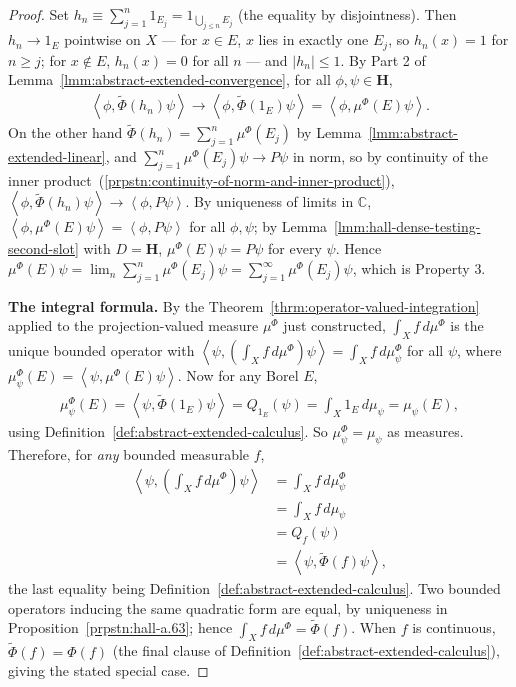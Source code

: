 \begin{proof}
Set $h_n \equiv \sum_{j=1}^n 1_{E_j} = 1_{\bigcup_{j\le n}E_j}$ (the equality by disjointness). Then $h_n \to 1_E$ pointwise on $X$ — for $x \in E$, $x$ lies in exactly one $E_j$, so $h_n(x) = 1$ for $n \ge j$; for $x \notin E$, $h_n(x)=0$ for all $n$ — and $\lvert h_n \rvert \le 1$. By Part 2 of Lemma~\ref{lmm:abstract-extended-convergence}, for all $\phi,\psi \in \mathbf{H}$,
\begin{align}
    \left< \phi, \widetilde\Phi(h_n)\psi \right> \longrightarrow \left< \phi, \widetilde\Phi(1_E)\psi \right> = \left< \phi, \mu^\Phi(E)\psi \right>.
\end{align}
On the other hand $\widetilde\Phi(h_n) = \sum_{j=1}^n \mu^\Phi(E_j)$ by Lemma~\ref{lmm:abstract-extended-linear}, and $\sum_{j=1}^n\mu^\Phi(E_j)\psi \to P\psi$ in norm, so by continuity of the inner product~(\ref{prpstn:continuity-of-norm-and-inner-product}), $\left< \phi, \widetilde\Phi(h_n)\psi \right> \to \left< \phi, P\psi \right>$. By uniqueness of limits in $\mathbb{C}$, $\left< \phi, \mu^\Phi(E)\psi \right> = \left< \phi, P\psi \right>$ for all $\phi,\psi$; by Lemma~\ref{lmm:hall-dense-testing-second-slot} with $D=\mathbf{H}$, $\mu^\Phi(E)\psi = P\psi$ for every $\psi$. Hence $\mu^\Phi(E)\psi = \lim_n \sum_{j=1}^n \mu^\Phi(E_j)\psi = \sum_{j=1}^\infty \mu^\Phi(E_j)\psi$, which is Property 3.

\textbf{The integral formula.} By the Theorem~\ref{thrm:operator-valued-integration} applied to the projection-valued measure $\mu^\Phi$ just constructed, $\int_X f\,d\mu^\Phi$ is the unique bounded operator with $\left< \psi, \left( \int_X f\,d\mu^\Phi \right)\psi \right> = \int_X f \, d\mu^\Phi_\psi$ for all $\psi$, where $\mu^\Phi_\psi(E) = \left< \psi, \mu^\Phi(E)\psi \right>$. Now for any Borel $E$,
\begin{align}
    \mu^\Phi_\psi(E) = \left< \psi, \widetilde\Phi(1_E)\psi \right> = Q_{1_E}(\psi) = \int_X 1_E \, d\mu_\psi = \mu_\psi(E),
\end{align}
using Definition~\ref{def:abstract-extended-calculus}. So $\mu^\Phi_\psi = \mu_\psi$ as measures. Therefore, for \textit{any} bounded measurable $f$,
\begin{align}
    \left< \psi, \left( \int_X f \, d\mu^\Phi \right)\psi \right> &= \int_X f \, d\mu^\Phi_\psi \\
                &= \int_X f \, d\mu_\psi \\
                &= Q_f(\psi) \\
                &= \left< \psi, \widetilde\Phi(f)\psi \right>,
\end{align}
the last equality being Definition~\ref{def:abstract-extended-calculus}. Two bounded operators inducing the same quadratic form are equal, by uniqueness in Proposition~\ref{prpstn:hall-a.63}; hence $\int_X f \, d\mu^\Phi = \widetilde\Phi(f)$. When $f$ is continuous, $\widetilde\Phi(f) = \Phi(f)$ (the final clause of Definition~\ref{def:abstract-extended-calculus}), giving the stated special case.
\end{proof}

